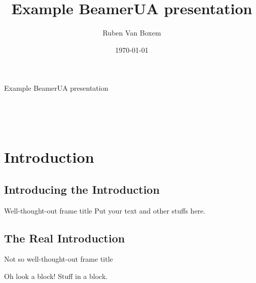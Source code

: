 \documentclass{beamer}
\title{Example BeamerUA presentation}
\author{Ruben Van Boxem}
\institute{Universiteit Antwerpen}
\date{\today}
\begin{document}
{
\begin{frame}
 \centering
 \textcolor{uared}{Example BeamerUA presentation}

 \textcolor{white}{Ruben Van Boxem}

 \textcolor{white}{\today}
\end{frame}
}

\section{Introduction}
\subsection{Introducing the Introduction}

\begin{frame}{Well-thought-out frame title}
Put your text and other stuffs here.
\end{frame}
\subsection{The Real Introduction}
\begin{frame}{Not so well-thought-out frame title}
 \begin{block}{Oh look a block!}
  Stuff in a block.
 \end{block}
\end{frame}
\end{document}
